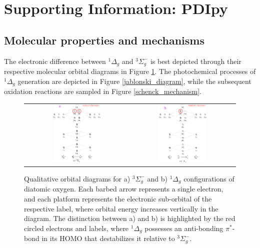 \section{Supporting Information: PDIpy}

\subsection{Molecular properties and mechanisms}
The electronic difference between $^1\Delta_g$ and $^3\Sigma_g^-$ is best depicted through their respective molecular orbital diagrams in Figure \ref{mo_diagrams}. The photochemical processes of $^1\Delta_g$ generation are depicted in Figure \ref{jablonski_diagram}, while the subsequent oxidation reactions are sampled in Figure \ref{schenck_mechanism}.

\begin{figure}
    \centering
    \begin{tabular}{c|c}
        \includegraphics[width = 0.48\textwidth]{images/PDIpy/background/triplet_mo_diagram.png}
        & \includegraphics[width = 0.48\textwidth]{images/PDIpy/background/singlet_mo_diagram.png}
    \end{tabular}
    \caption{
        Qualitative orbital diagrams for a) $^3\Sigma_g^-$ and b) $^1\Delta_g$ configurations of diatomic oxygen. Each barbed arrow represents a single electron, and each platform represents the electronic sub-orbital of the respective label, where orbital energy increases vertically in the diagram. The distinction between a) and b) is highlighted by the red circled electrons and labels, where $^1\Delta_g$ possesses an anti-bonding $\pi^*$-bond in its HOMO that destabilizes it relative to $^3\Sigma_g^-$.
    }
    \label{mo_diagrams}
\end{figure}

